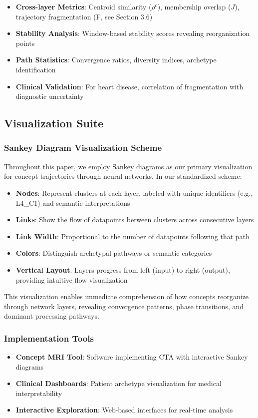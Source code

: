 \begin{itemize}
    \item \textbf{Cross-layer Metrics}: Centroid similarity ($\rho^c$), membership overlap ($J$), trajectory fragmentation (F, see Section 3.6)
    \item \textbf{Stability Analysis}: Window-based stability scores revealing reorganization points
    \item \textbf{Path Statistics}: Convergence ratios, diversity indices, archetype identification
    \item \textbf{Clinical Validation}: For heart disease, correlation of fragmentation with diagnostic uncertainty
\end{itemize}

\subsection{Visualization Suite}

\subsubsection{Sankey Diagram Visualization Scheme}
\label{sec:sankey_scheme}

Throughout this paper, we employ Sankey diagrams as our primary visualization for concept trajectories through neural networks. In our standardized scheme:

\begin{itemize}
    \item \textbf{Nodes}: Represent clusters at each layer, labeled with unique identifiers (e.g., L4\_C1) and semantic interpretations
    \item \textbf{Links}: Show the flow of datapoints between clusters across consecutive layers
    \item \textbf{Link Width}: Proportional to the number of datapoints following that path
    \item \textbf{Colors}: Distinguish archetypal pathways or semantic categories
    \item \textbf{Vertical Layout}: Layers progress from left (input) to right (output), providing intuitive flow visualization
\end{itemize}

This visualization enables immediate comprehension of how concepts reorganize through network layers, revealing convergence patterns, phase transitions, and dominant processing pathways.

\subsubsection{Implementation Tools}

\begin{itemize}
    \item \textbf{Concept MRI Tool}: Software implementing CTA with interactive Sankey diagrams
    \item \textbf{Clinical Dashboards}: Patient archetype visualization for medical interpretability
    \item \textbf{Interactive Exploration}: Web-based interfaces for real-time analysis
\end{itemize}


